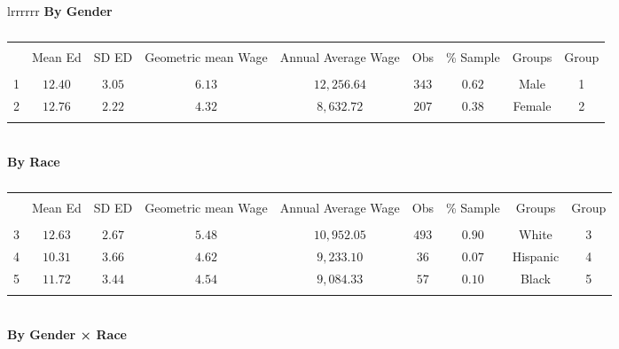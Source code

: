 \begin{table}[htbp]
\centering
\caption{Education and Wages by Gender and Race}
\begin{tabular}{lrrrrrr}
\toprule
\textbf{By Gender} \\

\begin{table}[!htbp] \centering 
  \caption{} 
  \label{} 
\begin{tabular}{@{\extracolsep{5pt}} ccccccccc} 
\\[-1.8ex]\hline 
\hline \\[-1.8ex] 
 & Mean Ed & SD ED & Geometric mean Wage & Annual Average Wage & Obs & \% Sample & Groups & Group \\ 
\hline \\[-1.8ex] 
1 & $12.40$ & $3.05$ & $6.13$ & $12,256.64$ & $343$ & $0.62$ & Male & 1 \\ 
2 & $12.76$ & $2.22$ & $4.32$ & $8,632.72$ & $207$ & $0.38$ & Female & 2 \\ 
\hline \\[-1.8ex] 
\end{tabular} 
\end{table} 
\\[0.5em]
\textbf{By Race} \\

\begin{table}[!htbp] \centering 
  \caption{} 
  \label{} 
\begin{tabular}{@{\extracolsep{5pt}} ccccccccc} 
\\[-1.8ex]\hline 
\hline \\[-1.8ex] 
 & Mean Ed & SD ED & Geometric mean Wage & Annual Average Wage & Obs & \% Sample & Groups & Group \\ 
\hline \\[-1.8ex] 
3 & $12.63$ & $2.67$ & $5.48$ & $10,952.05$ & $493$ & $0.90$ & White & 3 \\ 
4 & $10.31$ & $3.66$ & $4.62$ & $9,233.10$ & $36$ & $0.07$ & Hispanic & 4 \\ 
5 & $11.72$ & $3.44$ & $4.54$ & $9,084.33$ & $57$ & $0.10$ & Black & 5 \\ 
\hline \\[-1.8ex] 
\end{tabular} 
\end{table} 
\\[0.5em]
\textbf{By Gender × Race} \\


\end{tabular}
\end{table}
